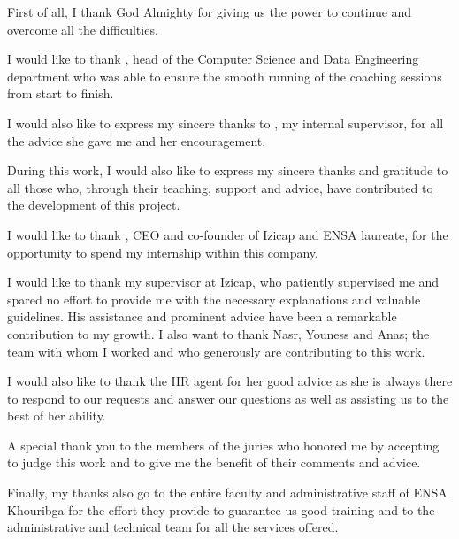 \remerciements

First of all, I thank God Almighty for giving us the power to continue and overcome all the difficulties.
\medskip

I would like to thank \textbf{}, head of the Computer Science and Data Engineering department who was able to ensure the smooth running of the coaching sessions from start to finish.

\medskip

I would also like to express my sincere thanks to \textbf{}, my internal supervisor, for all the advice she gave me and her encouragement.

\medskip

During this work, I would also like to express my sincere thanks and gratitude to all those who, through their teaching, support and advice, have contributed to the development of this project.

\medskip

I would like to thank \textbf{}, CEO and co-founder of Izicap and ENSA laureate, for the opportunity to spend my internship within this company.

\medskip

I would like to thank my supervisor at Izicap, \textbf{} who patiently supervised me and spared no effort to provide me with the necessary explanations and valuable guidelines. His assistance and prominent advice have been a remarkable contribution to my growth. I also want to thank Nasr, Youness and Anas; the team with whom I worked and who generously are contributing to this work.

\medskip

I would also like to thank the HR agent \textbf{} for her good advice as she is always there to respond to our requests and answer our questions as well as assisting us to the best of her ability.

\medskip

A special thank you to the members of the juries who honored me by accepting to judge this work and to give me the benefit of their comments and advice.

\medskip

Finally, my thanks also go to the entire faculty and administrative staff of ENSA Khouribga for the effort they provide to guarantee us good training and to the administrative and technical team for all the services offered.